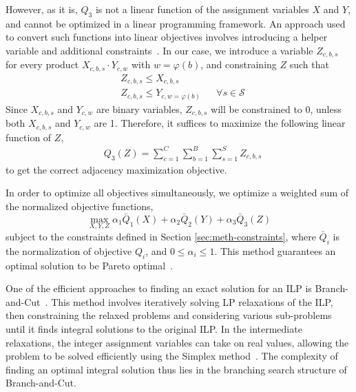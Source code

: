 However, as it is, $Q_3$ is not a linear function of the assignment variables
$X$ and $Y$, and cannot be optimized in a linear programming framework. 
An approach used to convert such
functions into linear objectives involves introducing a helper variable and
additional constraints~\cite{hammer_boolean_1968}. 
In our case, we introduce a variable $Z_{c, b, s}$ 
for every product $X_{c, b, s} \cdot Y_{c, w}$ with $w = \varphi(b)$, and
constraining $Z$ such that 
\begin{align}
&Z_{c, b, s} \leq X_{c, b, s} \label{eqn:helper-x-constraint}\\
&Z_{c, b, s} \leq Y_{c, w=\varphi(b)} &&\forall s\in\mathcal{S}
\label{eqn:helper-y-constraint}
\end{align}
Since $X_{c, b, s}$ and $Y_{c, w}$ are binary variables, $Z_{c, b, s}$ will be constrained
to 0, unless both $X_{c, b, s}$ and $Y_{c, w}$ are 1. Therefore, it suffices to maximize
the following linear function of $Z$,
\begin{align}
&Q_3(Z) = \sum_{c=1}^{C} \sum_{b=1}^{B} \sum_{s=1}^{S} Z_{c, b, s}
\end{align}
to get the correct adjacency maximization objective.

In order to optimize all objectives simultaneously, we optimize a weighted sum
of the normalized objective functions,
\begin{equation}
\max_{X, Y, Z} \alpha_1 \bar{Q}_1(X) + \alpha_2 \bar{Q}_2(Y) + \alpha_3
\bar{Q}_3(Z)
\end{equation}
subject to the constraints defined in Section \ref{sec:meth-constraints},
where $\bar{Q}_i$ is the normalization of objective $Q_i$, and $0 \leq \alpha_i \leq 1$. 
This method guarantees an optimal solution to be Pareto optimal~\cite{stanimirovic_linear_2011}. 

One of the efficient approaches to finding an exact solution for an 
ILP is Branch-and-Cut~\cite{mitchell_branch-and-cut_2002}.
This method involves iteratively solving 
LP relaxations of the ILP, then constraining the relaxed problems and
considering various sub-problems until it finds integral solutions to the 
original ILP.
In the intermediate relaxations, the integer assignment variables can
take on real values, allowing the problem to be solved efficiently using 
the Simplex method~\cite{shamir_efficiency_1987}. The 
complexity of finding an optimal integral solution thus lies in the 
branching search structure of Branch-and-Cut.